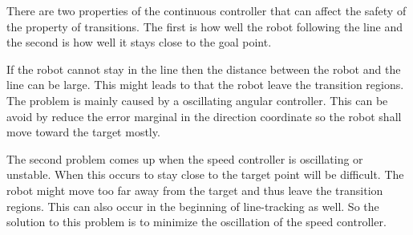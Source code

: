 There are two properties of the continuous controller that can affect the safety of the property of transitions. The first is how well the robot following the line and the second is how well it stays close to the goal point. 

If the robot cannot stay in the line then the distance between the robot and the line can be large. This might leads to that the robot leave the transition regions. The problem is mainly caused by a oscillating angular controller. This can be avoid by reduce the error marginal in the direction coordinate so the robot shall move toward the target mostly. 

The second problem comes up when the speed controller is oscillating or unstable. When this occurs to stay close to the target point will be difficult. The robot might move too far away from the target and thus leave the transition regions. This can also occur in the beginning of line-tracking as well. So the solution to this problem is to minimize the oscillation of the speed controller. 
